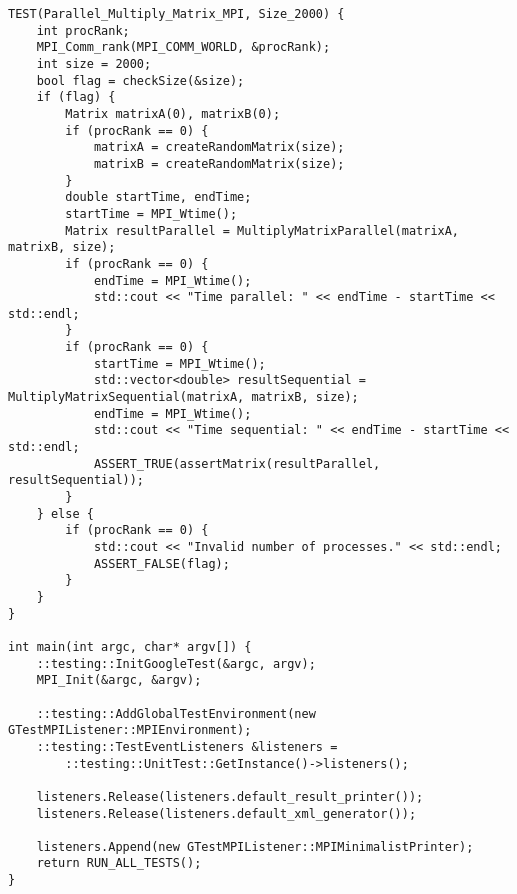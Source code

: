 \documentclass{report}
\begin{document}
\begin{lstlisting}
TEST(Parallel_Multiply_Matrix_MPI, Size_2000) {
    int procRank;
    MPI_Comm_rank(MPI_COMM_WORLD, &procRank);
    int size = 2000;
    bool flag = checkSize(&size);
    if (flag) {
        Matrix matrixA(0), matrixB(0);
        if (procRank == 0) {
            matrixA = createRandomMatrix(size);
            matrixB = createRandomMatrix(size);
        }
        double startTime, endTime;
        startTime = MPI_Wtime();
        Matrix resultParallel = MultiplyMatrixParallel(matrixA, matrixB, size);
        if (procRank == 0) {
            endTime = MPI_Wtime();
            std::cout << "Time parallel: " << endTime - startTime << std::endl;
        }
        if (procRank == 0) {
            startTime = MPI_Wtime();
            std::vector<double> resultSequential = MultiplyMatrixSequential(matrixA, matrixB, size);
            endTime = MPI_Wtime();
            std::cout << "Time sequential: " << endTime - startTime << std::endl;
            ASSERT_TRUE(assertMatrix(resultParallel, resultSequential));
        }
    } else {
        if (procRank == 0) {
            std::cout << "Invalid number of processes." << std::endl;
            ASSERT_FALSE(flag);
        }
    }
}

int main(int argc, char* argv[]) {
    ::testing::InitGoogleTest(&argc, argv);
    MPI_Init(&argc, &argv);

    ::testing::AddGlobalTestEnvironment(new GTestMPIListener::MPIEnvironment);
    ::testing::TestEventListeners &listeners =
        ::testing::UnitTest::GetInstance()->listeners();

    listeners.Release(listeners.default_result_printer());
    listeners.Release(listeners.default_xml_generator());

    listeners.Append(new GTestMPIListener::MPIMinimalistPrinter);
    return RUN_ALL_TESTS();
}
\end{lstlisting}
\end{document}
